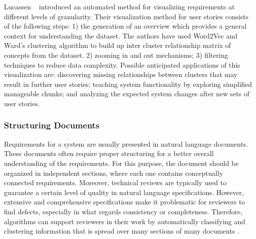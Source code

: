 Lucassen
\etal~\cite{Lucassen:2016} introduced an automated method for visualizing
requirements at different levels of granularity. Their visualization method for
user stories consists of the following steps: 1) the generation of an overview
which provides a general context for understanding the dataset. The authors have
used Word2Vec and Ward’s clustering algorithm to build up inter cluster
relationship matrix of concepts from the dataset.
2) zooming in and out mechanisms; 3) filtering techniques to reduce data
complexity. Possible anticipated applications of this visualization are:
discovering missing relationships between clusters that may result in further
user stories; teaching system functionality by exploring simplified manageable
chunks; and analyzing the expected system changes after new sets of user
stories.

\subsubsection{Structuring Documents} 

Requirements for a system are usually presented in natural language documents.
These documents often require proper structuring for a better overall
understanding of the requirements. For this purpose, the document should be
organized in independent sections, where each one contains conceptually
connected requirements\cite{Ferrari:2013}. Moreover, technical reviews are
typically used to guarantee a certain level of quality in natural language
specifications.
However, extensive and comprehensive specifications make it problematic for
reviewers to find defects, especially in what regards consistency or
completeness. Therefore, \ML algorithms can support reviewers in their work by
automatically classifying and clustering information that is spread over many
sections of many documents \cite{Ott:2013}.

